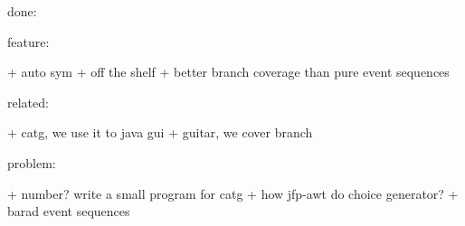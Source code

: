 done:

feature:

+ auto sym
+ off the shelf
+ better branch coverage than pure event sequences

related:

+ catg, we use it to java gui
+ guitar, we cover branch

problem:

+ number? write a small program for catg
+ how jfp-awt do choice generator?
+ barad event sequences
